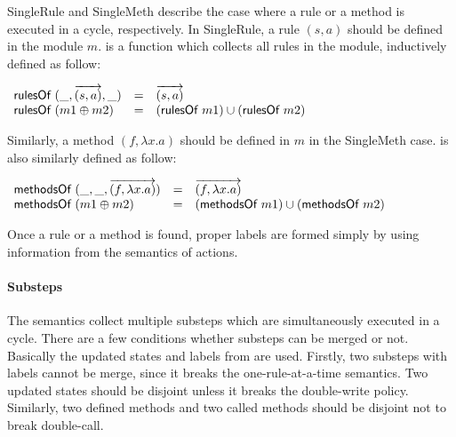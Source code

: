 SingleRule and SingleMeth describe the case where a rule or a method
is executed in a cycle, respectively. In SingleRule, a rule $(s, a)$
should be defined in the module $m$.  is a function which
collects all rules in the module, inductively defined as follow:
\begin{definition}
  \label{def-rulesofm}
  \mbox{}
  \begin{center}
    \begin{math}
      \begin{array}{lcl}
        \textsf{rulesOf}\ (\_, \overrightarrow{(s, a)}, \_) & = & \overrightarrow{(s, a)}\\
        \textsf{rulesOf}\ (m1 \oplus m2) & = & (\textsf{rulesOf}\ m1) \cup (\textsf{rulesOf}\ m2)\\
      \end{array}
    \end{math}
  \end{center}
\end{definition}
Similarly, a method $(f, \lambda x.a)$ should be defined in $m$ in the
SingleMeth case.  is also similarly defined as follow:
\begin{definition}
  \label{def-methsof}
  \mbox{}
  \begin{center}
    \begin{math}
      \begin{array}{lcl}
        \textsf{methodsOf}\ (\_, \_, \overrightarrow{(f, \lambda x.a)}) & = & \overrightarrow{(f, \lambda x.a)} \\
        \textsf{methodsOf}\ (m1 \oplus m2) & = & (\textsf{methodsOf}\ m1) \cup (\textsf{methodsOf}\ m2)\\
      \end{array}
    \end{math}
  \end{center}
\end{definition}
Once a rule or a method is found, proper labels are formed simply by
using information from the semantics of actions.

\paragraph{Substeps}
The \Substeps{} semantics collect multiple substeps which are
simultaneously executed in a cycle. There are a few conditions whether
substeps can be merged or not. Basically the updated states and labels
from \Substep{} are used. Firstly, two substeps with \alpharule{\cdot}
labels cannot be merge, since it breaks the one-rule-at-a-time
semantics. Two updated states should be disjoint unless it breaks the
double-write policy. Similarly, two defined methods and two called
methods should be disjoint not to break double-call.

